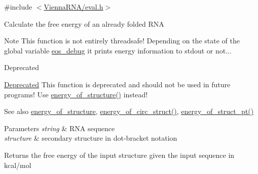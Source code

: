 {\ttfamily \#include $<$\mbox{\hyperlink{eval_8h}{Vienna\+R\+N\+A/eval.\+h}}$>$}

Calculate the free energy of an already folded R\+NA

\begin{DoxyNote}{Note}
This function is not entirely threadsafe! Depending on the state of the global variable \mbox{\hyperlink{group__eval__deprecated_ga567530678f6260a1a649a5beca5da4c5}{eos\+\_\+debug}} it prints energy information to stdout or not...~\newline
 
\end{DoxyNote}
\begin{DoxyRefDesc}{Deprecated}
\item[\mbox{\hyperlink{deprecated__deprecated000058}{Deprecated}}]This function is deprecated and should not be used in future programs! Use \mbox{\hyperlink{group__eval__deprecated_gaf93986cb3cb29770ec9cca69c9fab8cf}{energy\+\_\+of\+\_\+structure()}} instead!\end{DoxyRefDesc}


\begin{DoxySeeAlso}{See also}
\mbox{\hyperlink{group__eval__deprecated_gaf93986cb3cb29770ec9cca69c9fab8cf}{energy\+\_\+of\+\_\+structure}}, \mbox{\hyperlink{group__eval__deprecated_ga657222e2758c46bf13b416ef3032e417}{energy\+\_\+of\+\_\+circ\+\_\+struct()}}, \mbox{\hyperlink{group__eval__deprecated_ga27ce6f68512d43bf1fe14a06c9d76d5c}{energy\+\_\+of\+\_\+struct\+\_\+pt()}} 
\end{DoxySeeAlso}

\begin{DoxyParams}{Parameters}
{\em string} & R\+NA sequence \\
\hline
{\em structure} & secondary structure in dot-\/bracket notation \\
\hline
\end{DoxyParams}
\begin{DoxyReturn}{Returns}
the free energy of the input structure given the input sequence in kcal/mol 
\end{DoxyReturn}
\mbox{\label{group__eval__deprecated_ga27ce6f68512d43bf1fe14a06c9d76d5c}} 

